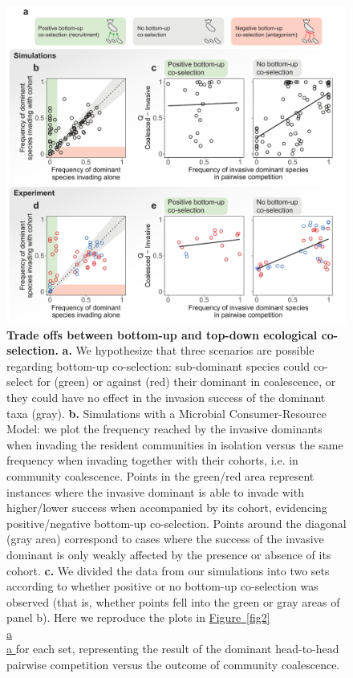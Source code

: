 \documentclass[a4paper,10pt]{article}
\newcommand{\figref}[2][]{%
  \hyperref[{#2}]{%
    Figure~\ref*{#2}%
    \ifx\\#1\\%
    \else
      #1%
    \fi
  }%
}
\begin{document}
\begin{figure}[!h]
\centering
\internallinenumbers
\includegraphics[scale=0.7,keepaspectratio]{figs/fig3.pdf}
\caption{\textbf{Trade offs between bottom-up and top-down ecological co-selection.}
\textbf{a.} We hypothesize that three scenarios are possible regarding bottom-up co-selection:
sub-dominant species could co-select for (green) or against (red) their dominant in coalescence,
or they could have no effect in the invasion success of the dominant taxa (gray).
\textbf{b.}
Simulations with a Microbial Consumer-Resource Model:
we plot the frequency reached by the invasive dominants when invading the resident communities
in isolation versus the same frequency when invading together with their cohorts,
i.e. in community coalescence.
Points in the green/red area represent instances where the invasive dominant is able to invade
with higher/lower success when accompanied by its cohort, evidencing positive/negative
bottom-up co-selection.
Points around the diagonal (gray area) correspond to cases where the success of the invasive dominant
is only weakly affected by the presence or absence of its cohort.
\textbf{c.} We divided the data from our simulations into two sets according to whether
positive or no bottom-up co-selection was observed (that is, whether points fell into the green or gray
areas of panel b). Here we reproduce the plots in \figref[a]{fig2} for each set, representing the
result of the dominant head-to-head pairwise competition versus the outcome of community coalescence.
}
\end{figure}
\end{document}
